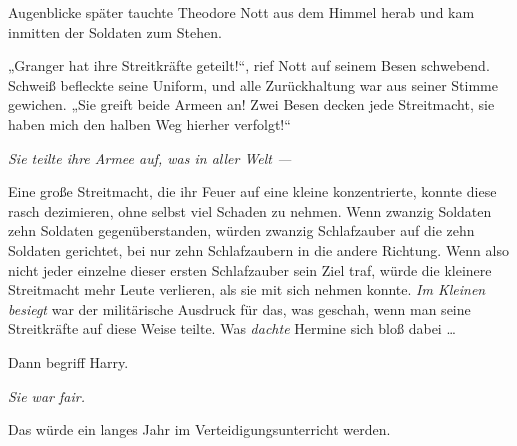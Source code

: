 Augenblicke später tauchte Theodore Nott aus dem Himmel herab und kam inmitten der Soldaten zum Stehen.

„Granger hat ihre Streitkräfte geteilt!“, rief Nott auf seinem Besen schwebend. Schweiß befleckte seine Uniform, und alle Zurückhaltung war aus seiner Stimme gewichen.
„Sie greift beide Armeen an! Zwei Besen decken jede Streitmacht, sie haben mich den halben Weg hierher verfolgt!“

\emph{Sie teilte ihre Armee auf, was in aller Welt —}

Eine große Streitmacht, die ihr Feuer auf eine kleine konzentrierte, konnte diese rasch dezimieren, ohne selbst viel Schaden zu nehmen. Wenn zwanzig Soldaten zehn Soldaten gegenüberstanden, würden zwanzig Schlafzauber auf die zehn Soldaten gerichtet, bei nur zehn Schlafzaubern in die andere Richtung. Wenn also nicht jeder einzelne dieser ersten Schlafzauber sein Ziel traf, würde die kleinere Streitmacht mehr Leute verlieren, als sie mit sich nehmen konnte. \emph{Im Kleinen besiegt} war der militärische Ausdruck für das, was geschah, wenn man seine Streitkräfte auf diese Weise teilte. Was \emph{dachte} Hermine sich bloß dabei …

Dann begriff Harry.

\emph{Sie war fair.}

Das würde ein langes Jahr im Verteidigungsunterricht werden.

